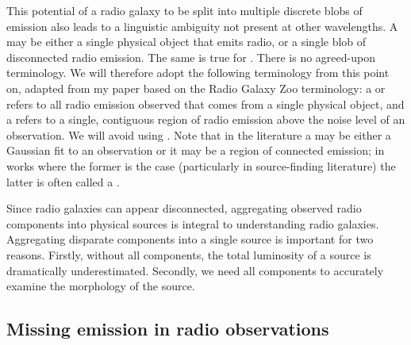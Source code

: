     This potential of a radio galaxy to be split into multiple discrete blobs of emission also leads to a linguistic ambiguity not present at other wavelengths. A  may be either a single physical object that emits radio, or a single blob of disconnected radio emission. The same is true for . There is no agreed-upon terminology. We will therefore adopt the following terminology from this point on, adapted from my paper \citep{alger18radio} based on the Radio Galaxy Zoo terminology: a  or  refers to all radio emission observed that comes from a single physical object, and a  refers to a single, contiguous region of radio emission above the noise level of an observation. We will avoid using . Note that in the literature a  may be either a Gaussian fit to an observation or it may be a region of connected emission; in works where the former is the case (particularly in source-finding literature) the latter is often called a .

    Since radio galaxies can appear disconnected, aggregating observed radio components into physical sources is integral to understanding radio galaxies. Aggregating disparate components into a single source is important for two reasons. Firstly, without all components, the total luminosity of a source is dramatically underestimated. Secondly, we need all components to accurately examine the morphology of the source.
    
    \subsection{Missing emission in radio observations}
    \label{sec:missing-emission}

